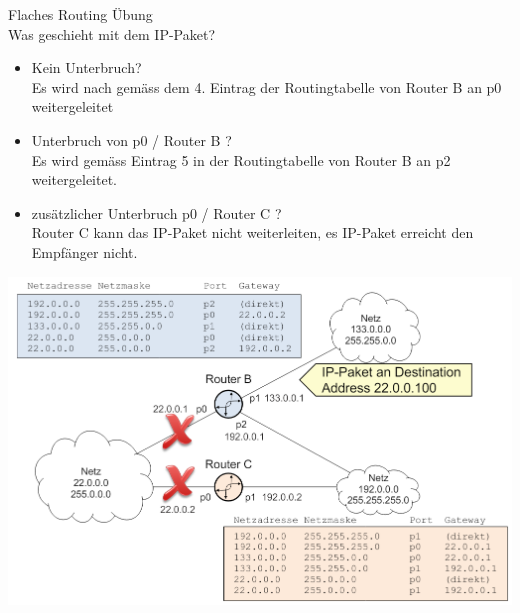 \begin{example2}{Flaches Routing Übung}\\
Was geschieht mit dem IP-Paket?
    \begin{itemize}
        \item Kein Unterbruch?\\ Es wird nach gemäss dem 4. Eintrag der Routingtabelle von Router B an p0 weitergeleitet
        \item Unterbruch von p0 / Router B ? \\ Es wird gemäss Eintrag 5 in der Routingtabelle von Router B an p2 weitergeleitet.
        \item zusätzlicher Unterbruch p0 / Router C ?\\ Router C kann das IP-Paket nicht weiterleiten, es IP-Paket erreicht den Empfänger nicht.
    \end{itemize}
        \includegraphics[width=1\linewidth]{images/flaches_routing_bsp.png}
\end{example2}

